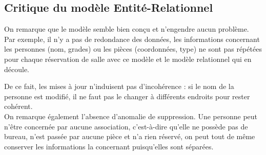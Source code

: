 \subsection{Critique du modèle Entité-Relationnel}
	On remarque que le modèle semble bien conçu et n'engendre aucun problème. Par exemple, il n'y a pas de redondance des données, les informations concernant les personnes (nom, grades) ou les pièces (coordonnées, type) ne sont pas répétées pour chaque réservation de salle avec ce modèle et le modèle relationnel qui en découle. 
	
	De ce fait, les mises à jour n'induisent pas d'incohérence : si le nom de la personne est modifié, il ne faut pas le changer à différents endroits pour rester cohérent.\\
	
	On remarque également l'absence d'anomalie de suppression. Une personne peut n'être concernée par aucune association, c'est-à-dire qu'elle ne possède pas de bureau, n'est passée par aucune pièce et n'a rien réservé, on peut tout de même conserver les informations la concernant puisqu'elles sont séparées.
